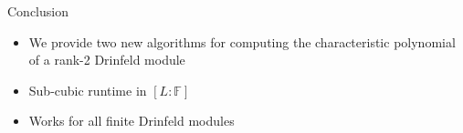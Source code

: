 \documentclass{beamer}
\newcommand{\f}{\mathbb{F}}
\begin{document}

\begin{frame}{Conclusion}

\begin{itemize}
    \item We provide two new algorithms for computing the characteristic polynomial of a rank-2 Drinfeld module
    \item Sub-cubic runtime in $[L:\f]$
    \item Works for all finite Drinfeld modules
\end{itemize}
    
\end{frame}





\end{document}
